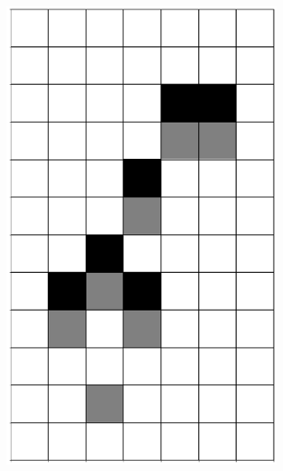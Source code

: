 \documentclass[12pt]{article}
\numberwithin{figure}{section} %
\begin{document}
\begin{figure}[H]
\begin{subfigure}{0.3\textwidth}
     		\includegraphics[angle=270,width=\linewidth]{Section4/10.1}
     		\subcaption{}
   	\end{subfigure}
        \begin{subfigure}{0.3\textwidth}
     		\centering

\end{subfigure}
\end{figure}
\end{document}
